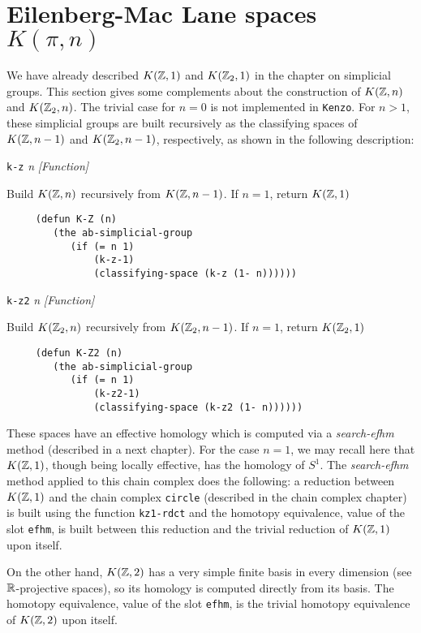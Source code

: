 \section {Eilenberg-Mac Lane spaces $K(\pi,n)$}

We have already described $K({{\Bbb Z}},1)$ and $K({{\Bbb Z}}_2,1)$ in the chapter on simplicial groups. 
This section gives some complements about the construction of $K({{\Bbb Z}},n)$ and $K({{\Bbb Z}}_2,n)$. The trivial case
for $n=0$ is not implemented in {\tt Kenzo}. For $n > 1$, these simplicial groups
are built recursively as the classifying spaces of $K({{\Bbb Z}},n-1)$ and $K({{\Bbb Z}}_2,n-1)$, respectively, as shown
in the following description:
\par
\vskip 0.40cm
{\parindent=0mm
{\leftskip=5mm
{\tt k-z} {\em n} \hfill {\em [Function]} \par}
{\leftskip=15mm
Build $K({{\Bbb Z}},n)$ recursively from $K({{\Bbb Z}},n-1)$. If $n=1$, return $K({{\Bbb Z}},1)$
{\footnotesize\begin{verbatim}
     (defun K-Z (n)
        (the ab-simplicial-group
           (if (= n 1)
               (k-z-1)
               (classifying-space (k-z (1- n))))))
\end{verbatim}}
\par}
{\leftskip=5mm
{\tt k-z2} {\em n} \hfill {\em [Function]} \par}
{\leftskip=15mm
Build $K({{\Bbb Z}}_2,n)$ recursively from $K({{\Bbb Z}}_2,n-1)$. If $n=1$, return $K({{\Bbb Z}}_2,1)$
{\footnotesize\begin{verbatim}
     (defun K-Z2 (n)
        (the ab-simplicial-group
           (if (= n 1)
               (k-z2-1)
               (classifying-space (k-z2 (1- n))))))
\end{verbatim}}
\par}}
These spaces have an effective homology which is computed via a {\em search-efhm} method (described in a next chapter).
For the case $n=1$, we may recall here that $K({{\Bbb Z}},1)$, though being locally effective, 
has the homology of $S^1$. The  {\em search-efhm} method applied to this chain complex does the following:  a reduction
between $K({{\Bbb Z}},1)$ and the chain complex {\tt circle} (described in the chain complex chapter) is
built using the function {\tt kz1-rdct} and the homotopy equivalence, value of the slot {\tt efhm}, is
built between this reduction and the trivial reduction of $K({{\Bbb Z}},1)$ upon itself.\par
On the other hand, $K({{\Bbb Z}},2)$ has a very simple finite basis in every dimension (see ${\Bbb R}$-projective 
spaces), so its homology is computed directly from its basis. The  homotopy 
equivalence, value of the slot {\tt efhm}, is the trivial homotopy equivalence of $K({{\Bbb Z}},2)$ upon
itself. 
\newpage

